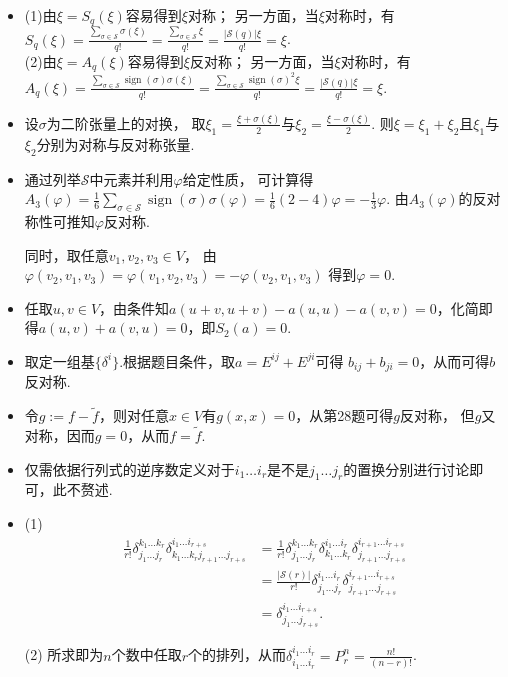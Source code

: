 \begin{itemize}
    \item [25.]
	(1)由$\xi=S_q(\xi)$容易得到$\xi$对称；
    另一方面，当$\xi$对称时，有$S_q(\xi)=\frac{\sum_{\sigma \in \mathscr{S}} \sigma(\xi)}{q!}=\frac{\sum_{\sigma \in \mathscr{S}} \xi}{q!}=\frac{|\mathscr{S}(q)|\xi}{q!}=\xi$.\\

	(2)由$\xi=A_q(\xi)$容易得到$\xi$反对称；
    另一方面，当$\xi$对称时，有$A_q(\xi)=\frac{\sum_{\sigma \in \mathscr{S}} \operatorname{sign}(\sigma)\sigma(\xi)}{q!}=\frac{\sum_{\sigma \in \mathscr{S}} {\operatorname{sign}(\sigma)}^2\xi}{q!}=\frac{|\mathscr{S}(q)|\xi}{q!}=\xi$.
	
	\item[26.]
	设$\sigma$为二阶张量上的对换，
    取$\xi_1=\frac{\xi+\sigma(\xi)}{2}$与$\xi_2=\frac{\xi-\sigma(\xi)}{2}$.
    则$\xi=\xi_1+\xi_2$且$\xi_1$与$\xi_2$分别为对称与反对称张量.
	
	\item[27.]
	通过列举$\mathscr{S}$中元素并利用$\varphi$给定性质，
    可计算得$A_3(\varphi)=\frac{1}{6}\sum\limits_{\sigma \in \mathscr{S}}\operatorname{sign}(\sigma)\sigma(\varphi)=\frac{1}{6}(2-4)\varphi=-\frac{1}{3}\varphi$.
    由$A_3(\varphi)$的反对称性可推知$\varphi$反对称.\par
	同时，取任意$v_1,v_2,v_3 \in V$，
    由$\varphi(v_2,v_1,v_3)=\varphi(v_1,v_2,v_3)=-\varphi(v_2,v_1,v_3)$
    得到$\varphi=0$.
	
	\item[28.]
	任取$u,v \in V$，由条件知$a(u+v,u+v)-a(u,u)-a(v,v)=0$，化简即得$a(u,v)+a(v,u)=0$，即$S_2(a)=0$.
	
	\item[29.]
	取定一组基$\{\delta^i\}$.根据题目条件，取$a=E^{ij}+E^{ji}$可得
    $b_{ij}+b_{ji}=0$，从而可得$b$反对称.
	
	\item[30.]
	令$g:=f-\tilde{f}$，则对任意$x\in V$有$g(x,x)=0$，从第28题可得$g$反对称，
    但$g$又对称，因而$g=0$，从而$f=\tilde{f}$.
	
	\item[31.]
	仅需依据行列式的逆序数定义对于$i_1\dots i_r$是不是$j_1\dots j_r$的置换分别进行讨论即可，此不赘述.
	
	\item[32.]
	(1)
	\begin{align*}
		\frac{1}{r!}\delta^{k_1\dots k_r}_{j_1\dots j_r}\delta^{i_1\dots i_{r+s}}_{k_1\dots k_r j_{r+1}\dots j_{r+s}} &
        =\frac{1}{r!}\delta^{k_1\dots k_r}_{j_1\dots j_r}\delta^{i_1\dots i_r}_{k_1\dots k_r}\delta^{i_{r+1}\dots i_{r+s}}_{j_{r+1}\dots j_{r+s}}\\
		&=\frac{|\mathscr{S}(r)|}{r!}\delta^{i_1\dots i_r}_{j_1\dots j_r}\delta^{i_{r+1}\dots i_{r+s}}_{j_{r+1}\dots j_{r+s}}\\
		&=\delta^{i_1\dots i_{r+s}}_{j_1\dots j_{r+s}}.
	\end{align*}\par
	(2)
	所求即为$n$个数中任取$r$个的排列，从而$\delta^{i_1\dots i_r}_{i_1\dots i_r}=P^n_r=\frac{n!}{(n-r)!}$.
    

\end{itemize}
